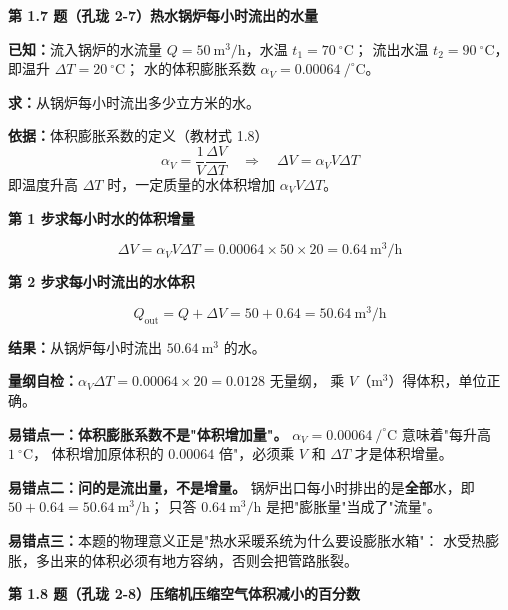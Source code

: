 \noindent\textbf{第 1.7 题（孔珑 2-7）\quad 热水锅炉每小时流出的水量}

\begin{jie}
\textbf{已知：}流入锅炉的水流量 $Q=50\ \mathrm{m^3/h}$，水温 $t_1=70\ ^{\circ}\mathrm{C}$；
流出水温 $t_2=90\ ^{\circ}\mathrm{C}$，即温升 $\Delta T=20\ ^{\circ}\mathrm{C}$；
水的体积膨胀系数 $\alpha_V=0.00064\ /^{\circ}\mathrm{C}$。

\textbf{求：}从锅炉每小时流出多少立方米的水。

\textbf{依据：}体积膨胀系数的定义（教材式 1.8）
\[ \alpha_V=\frac{1}{V}\frac{\Delta V}{\Delta T}
   \quad\Longrightarrow\quad \Delta V=\alpha_V V\Delta T \]
即温度升高 $\Delta T$ 时，一定质量的水体积增加 $\alpha_V V\Delta T$。

\textbf{第 1 步\quad 求每小时水的体积增量}

\[ \Delta V=\alpha_V V\Delta T=0.00064\times50\times20=0.64\ \mathrm{m^3/h} \]

\textbf{第 2 步\quad 求每小时流出的水体积}

\[ Q_{\mathrm{out}}=Q+\Delta V=50+0.64=50.64\ \mathrm{m^3/h} \]

\textbf{结果：}从锅炉每小时流出 $50.64\ \mathrm{m^3}$ 的水。

\textbf{量纲自检：}$\alpha_V\Delta T=0.00064\times20=0.0128$ 无量纲，
乘 $V$（$\mathrm{m^3}$）得体积，单位正确。
\end{jie}

\begin{yicuo}
\textbf{易错点一：体积膨胀系数不是"体积增加量"。}
$\alpha_V=0.00064\ /^{\circ}\mathrm{C}$ 意味着"每升高 $1\ ^{\circ}\mathrm{C}$，
体积增加原体积的 $0.00064$ 倍"，必须乘 $V$ 和 $\Delta T$ 才是体积增量。

\textbf{易错点二：问的是流出量，不是增量。}
锅炉出口每小时排出的是\textbf{全部}水，即 $50+0.64=50.64\ \mathrm{m^3/h}$；
只答 $0.64\ \mathrm{m^3/h}$ 是把"膨胀量"当成了"流量"。

\textbf{易错点三：}本题的物理意义正是"热水采暖系统为什么要设膨胀水箱"：
水受热膨胀，多出来的体积必须有地方容纳，否则会把管路胀裂。
\end{yicuo}

\noindent\textbf{第 1.8 题（孔珑 2-8）\quad 压缩机压缩空气体积减小的百分数}

